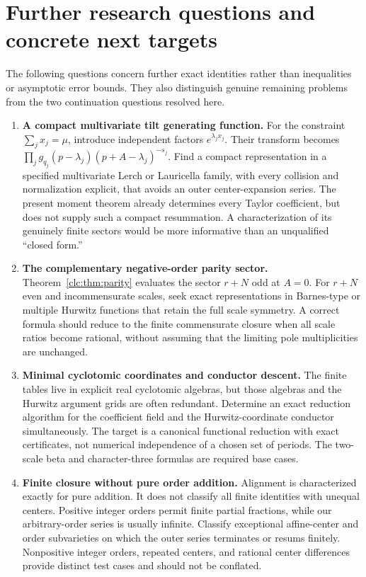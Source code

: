 \documentclass[11pt,a4paper]{article}
\numberwithin{equation}{section}
\theoremstyle{definition}\newtheorem{definition}[theorem]{Definition}
\theoremstyle{remark}\newtheorem{remark}[theorem]{Remark}
\begin{document}
\section{Further research questions and concrete next targets}
\label{clc:sec:questions}

The following questions concern further exact identities rather than
inequalities or asymptotic error bounds. They also distinguish genuine
remaining problems from the two continuation questions resolved here.

\begin{enumerate}[label=\textbf{Q\arabic*.},leftmargin=2.8em,itemsep=9pt]
\item \textbf{A compact multivariate tilt generating function.}
For the constraint $\sum_jx_j=\mu$, introduce independent factors
$e^{\lambda_jx_j}$. Their transform becomes
$\prod_jg_{q_j}(p-\lambda_j)(p+A-\lambda_j)^{-s_j}$.
Find a compact representation in a specified multivariate Lerch or
Lauricella family, with every collision and normalization explicit,
that avoids an outer center-expansion series. The present moment theorem
already determines every Taylor coefficient, but does not supply such
a compact resummation. A characterization of its genuinely finite
sectors would be more informative than an unqualified ``closed form.''

\item \textbf{The complementary negative-order parity sector.}
Theorem~\ref{clc:thm:parity} evaluates the sector $r+N$ odd at $A=0$.
For $r+N$ even and incommensurate scales, seek exact representations in
Barnes-type or multiple Hurwitz functions that retain the full scale
symmetry. A correct formula should reduce to the finite commensurate
closure when all scale ratios become rational, without assuming that
the limiting pole multiplicities are unchanged.

\item \textbf{Minimal cyclotomic coordinates and conductor descent.}
The finite tables live in explicit real cyclotomic algebras, but those
algebras and the Hurwitz argument grids are often redundant. Determine
an exact reduction algorithm for the coefficient field and the
Hurwitz-coordinate conductor simultaneously. The target is a canonical
functional reduction with exact certificates, not numerical independence
of a chosen set of periods. The two-scale beta and character-three
formulas are required base cases.

\item \textbf{Finite closure without pure order addition.}
Alignment is characterized exactly for pure addition. It does not
classify all finite identities with unequal centers. Positive integer
orders permit finite partial fractions, while our arbitrary-order
series is usually infinite. Classify exceptional affine-center and
order subvarieties on which the outer series terminates or resums
finitely. Nonpositive integer orders, repeated centers, and rational
center differences provide distinct test cases and should not be
conflated.


\end{enumerate}
\end{document}
